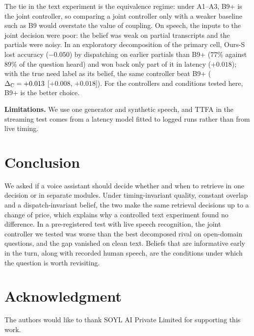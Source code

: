 The tie in the text experiment is the equivalence regime: under A1--A3, B9+
is the joint controller, so comparing a joint controller only with a weaker
baseline such as B9 would overstate the value of coupling. On speech, the
inputs to the joint decision were poor: the belief was weak on partial
transcripts and the partials were noisy. In an exploratory decomposition of
the primary cell, Ours-S lost accuracy ($-0.050$) by dispatching on earlier
partials than B9+ (77\% against 89\% of the question heard) and won back only
part of it in latency ($+0.018$); with the true need label as its belief, the
same controller beat B9+ ($\Delta_{\mathrm{C}}=+0.013$ [$+0.008$, $+0.018$]). For the
controllers and conditions tested here, B9+ is the better choice.

\textbf{Limitations.} We use one generator and synthetic speech, and TTFA in
the streaming test comes from a latency model fitted to logged runs rather
than from live timing.

\section{Conclusion}\label{sec:conclusion}

We asked if a voice assistant should decide whether and when to retrieve in
one decision or in separate modules. Under timing-invariant quality, constant
overlap and a dispatch-invariant belief, the two make the same retrieval
decisions up to a change of price, which explains why a controlled text
experiment found no difference. In a pre-registered test with live speech
recognition, the joint controller we tested was worse than the best
decomposed rival on open-domain questions, and the gap vanished on clean
text. Beliefs that are informative early in the turn, along with recorded
human speech, are the conditions under which the question is worth
revisiting.

\section*{Acknowledgment}
The authors would like to thank SOYL AI Private Limited for supporting this work.

\FloatBarrier




